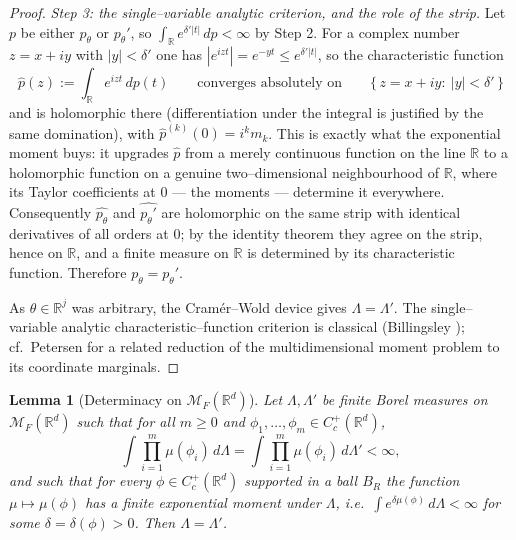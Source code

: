 \documentclass[11pt]{article}
\newtheorem{lemma}[theorem]{Lemma}
\theoremstyle{definition}
\theoremstyle{remark}
\newcommand{\R}{\mathbb{R}}
\newcommand{\cM}{{\mathcal{M}_F(\R^d)}}          %
\newcommand{\Cc}{C_c^+(\R^d)}
\numberwithin{equation}{section}
\theoremstyle{plain}
\theoremstyle{definition}
\theoremstyle{remark}
\theoremstyle{plain}
\begin{document}
\begin{proof}
\emph{Step 3: the single--variable analytic criterion, and the role of the
strip.} Let $p$ be either $p_\theta$ or $p_\theta'$, so $\int_\R
e^{\delta'|t|}\,dp<\infty$ by Step 2. For a complex number $z=x+iy$ with
$|y|<\delta'$ one has $|e^{izt}|=e^{-yt}\le e^{\delta'|t|}$, so the
characteristic function
\[
\widehat p(z):=\int_\R e^{izt}\,dp(t)\qquad\text{converges absolutely on}\qquad
\{\,z=x+iy:\ |y|<\delta'\,\}
\]
and is holomorphic there (differentiation under the integral is justified
by the same domination), with $\widehat p^{(k)}(0)=i^k m_k$. This is exactly
what the exponential moment buys: it upgrades $\widehat p$ from a merely
continuous function on the line $\R$ to a holomorphic function on a genuine
two--dimensional neighbourhood of $\R$, where its Taylor coefficients at $0$ ---
the moments --- determine it everywhere. Consequently $\widehat{p_\theta}$ and
$\widehat{p_\theta'}$ are holomorphic on the same strip with identical
derivatives of all orders at $0$; by the identity theorem they agree on the
strip, hence on $\R$, and a finite measure on $\R$ is determined by its
characteristic function. Therefore $p_\theta=p_\theta'$.

As $\theta\in\R^j$ was arbitrary, the Cram\'er--Wold device gives
$\Lambda=\Lambda'$. The single--variable analytic characteristic--function
criterion is classical (Billingsley \cite[Chapter~30]{Bil95}); cf.\ Petersen \cite{Pet82} for a related reduction of the multidimensional moment problem to its coordinate marginals.
\end{proof}

\begin{lemma}[Determinacy on $\cM$]\label{lem:determinacy}
Let $\Lambda,\Lambda'$ be finite Borel measures on $\cM$ such that for all
$m\ge0$ and $\phi_1,\dots,\phi_m\in\Cc$,
\[
\int\prod_{i=1}^m\mu(\phi_i)\,d\Lambda
=\int\prod_{i=1}^m\mu(\phi_i)\,d\Lambda'<\infty,
\]
and such that for every $\phi\in\Cc$ supported in a ball $B_{R}$ the
function $\mu\mapsto\mu(\phi)$ has a finite exponential moment under
$\Lambda$, i.e.\ $\int e^{\delta\mu(\phi)}\,d\Lambda<\infty$ for some
$\delta=\delta(\phi)>0$. Then $\Lambda=\Lambda'$.
\end{lemma}
\end{document}
